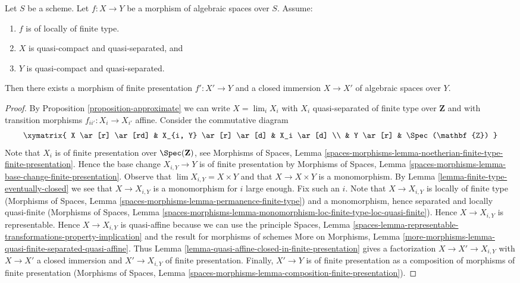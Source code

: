 \begin{lemma}
\label{lemma-finite-type-closed-in-finite-presentation}
Let $S$ be a scheme. Let $f : X \to Y$ be a morphism of algebraic spaces
over $S$. Assume:
\begin{enumerate}
\item $f$ is of locally of finite type.
\item $X$ is quasi-compact and quasi-separated, and
\item $Y$ is quasi-compact and quasi-separated.
\end{enumerate}
Then there exists a morphism of finite presentation
$f' : X' \to Y$ and a closed immersion $X \to X'$ of
algebraic spaces over $Y$.
\end{lemma}

\begin{proof}
By Proposition \ref{proposition-approximate}
we can write $X = \lim_i X_i$ with $X_i$ quasi-separated of finite type over
$\mathbf{Z}$ and with transition morphisms $f_{ii'} : X_i \to X_{i'}$ affine.
Consider the commutative diagram
$$
\xymatrix{
X \ar[r] \ar[rd] & X_{i, Y} \ar[r] \ar[d] & X_i \ar[d] \\
& Y \ar[r] & \Spec(\mathbf{Z})
}
$$
Note that $X_i$ is of finite presentation over $\Spec(\mathbf{Z})$, see
Morphisms of Spaces, Lemma
\ref{spaces-morphisms-lemma-noetherian-finite-type-finite-presentation}.
Hence the base change $X_{i, Y} \to Y$ is of finite presentation by
Morphisms of Spaces, Lemma
\ref{spaces-morphisms-lemma-base-change-finite-presentation}.
Observe that $\lim X_{i, Y} = X \times Y$ and that $X \to X \times Y$ is a
monomorphism. By Lemma \ref{lemma-finite-type-eventually-closed}
we see that $X \to X_{i, Y}$ is a monomorphism for $i$ large enough.
Fix such an $i$. Note that $X \to X_{i, Y}$ is locally of finite type
(Morphisms of Spaces, Lemma
\ref{spaces-morphisms-lemma-permanence-finite-type})
and a monomorphism, hence separated and locally quasi-finite
(Morphisms of Spaces, Lemma
\ref{spaces-morphisms-lemma-monomorphism-loc-finite-type-loc-quasi-finite}).
Hence $X \to X_{i, Y}$ is representable.
Hence $X \to X_{i, Y}$ is quasi-affine because we can use the
principle Spaces, Lemma
\ref{spaces-lemma-representable-transformations-property-implication}
and the result for morphisms of schemes More on Morphisms, Lemma
\ref{more-morphisms-lemma-quasi-finite-separated-quasi-affine}.
Thus Lemma \ref{lemma-quasi-affine-closed-in-finite-presentation}
gives a factorization $X \to X' \to X_{i, Y}$
with $X \to X'$ a closed immersion and $X' \to X_{i, Y}$ of finite
presentation. Finally, $X' \to Y$ is of finite presentation as a
composition of morphisms of finite presentation
(Morphisms of Spaces, Lemma
\ref{spaces-morphisms-lemma-composition-finite-presentation}).
\end{proof}

